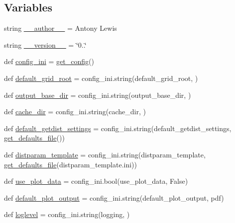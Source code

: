 \subsection*{Variables}
\begin{DoxyCompactItemize}
\item 
string \mbox{\hyperlink{namespacegetdist_a963a563622eb870a0443ed41523d5b52}{\+\_\+\+\_\+author\+\_\+\+\_\+}} = \textquotesingle{}Antony Lewis\textquotesingle{}
\item 
string \mbox{\hyperlink{namespacegetdist_a672826807c8312f67fde2bdfd46599a5}{\+\_\+\+\_\+version\+\_\+\+\_\+}} = \char`\"{}0..\char`\"{}
\item 
def \mbox{\hyperlink{namespacegetdist_a5c99c0ba26cb1f3808d81c76b8de4c91}{config\+\_\+ini}} = \mbox{\hyperlink{namespacegetdist_ae1cef30c152a1bd4e44ee539fd21c3db}{get\+\_\+config}}()
\item 
def \mbox{\hyperlink{namespacegetdist_a2ed5e7cfdf637a19ad09e719c419963a}{default\+\_\+grid\+\_\+root}} = config\+\_\+ini.\+string(\textquotesingle{}default\+\_\+grid\+\_\+root\textquotesingle{}, \textquotesingle{}\textquotesingle{})
\item 
def \mbox{\hyperlink{namespacegetdist_abe320c8ae9dc34e1322e80f98e24bebf}{output\+\_\+base\+\_\+dir}} = config\+\_\+ini.\+string(\textquotesingle{}output\+\_\+base\+\_\+dir\textquotesingle{}, \textquotesingle{}\textquotesingle{})
\item 
def \mbox{\hyperlink{namespacegetdist_a14c15d42e852457cae74a89c50446ecb}{cache\+\_\+dir}} = config\+\_\+ini.\+string(\textquotesingle{}cache\+\_\+dir\textquotesingle{}, \textquotesingle{}\textquotesingle{})
\item 
def \mbox{\hyperlink{namespacegetdist_a4940be008227154f9cd2c59d05256103}{default\+\_\+getdist\+\_\+settings}} = config\+\_\+ini.\+string(\textquotesingle{}default\+\_\+getdist\+\_\+settings\textquotesingle{}, \mbox{\hyperlink{namespacegetdist_af1887c8e2da86996dd314d3cecb257dc}{get\+\_\+defaults\+\_\+file}}())
\item 
def \mbox{\hyperlink{namespacegetdist_a5d4be353cd53f5baa773acef0b256264}{distparam\+\_\+template}} = config\+\_\+ini.\+string(\textquotesingle{}distparam\+\_\+template\textquotesingle{}, \mbox{\hyperlink{namespacegetdist_af1887c8e2da86996dd314d3cecb257dc}{get\+\_\+defaults\+\_\+file}}(\textquotesingle{}distparam\+\_\+template.\+ini\textquotesingle{}))
\item 
def \mbox{\hyperlink{namespacegetdist_a9a0a7b564c5c7f59a2f57263aa8a923b}{use\+\_\+plot\+\_\+data}} = config\+\_\+ini.\+bool(\textquotesingle{}use\+\_\+plot\+\_\+data\textquotesingle{}, False)
\item 
def \mbox{\hyperlink{namespacegetdist_a41e32cd823783b6abcda710f3eeeb0d0}{default\+\_\+plot\+\_\+output}} = config\+\_\+ini.\+string(\textquotesingle{}default\+\_\+plot\+\_\+output\textquotesingle{}, \textquotesingle{}pdf\textquotesingle{})
\item 
def \mbox{\hyperlink{namespacegetdist_a2cfb6d100005a1aebc5b4e380888ee07}{loglevel}} = config\+\_\+ini.\+string(\textquotesingle{}logging\textquotesingle{}, \textquotesingle{}\textquotesingle{})
\end{DoxyCompactItemize}


